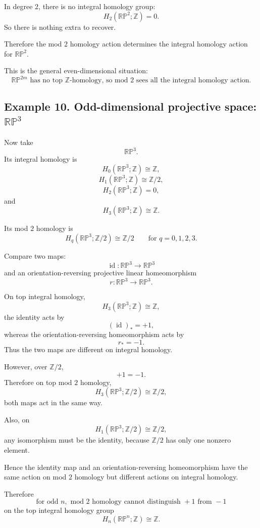 \documentclass[12pt,a4paper]{article}
\theoremstyle{notespace}
\begin{document}
In degree \(2\), there is no integral homology group:
\[
H_2(\mathbb{RP}^2;\mathbb Z)=0.
\]
So there is nothing extra to recover.

Therefore the mod \(2\) homology action determines the integral homology action for \(\mathbb{RP}^2\).

This is the general even-dimensional situation:
\[
\boxed{
	\mathbb{RP}^{2m}
	\text{ has no top } \mathbb Z\text{-homology, so mod }2\text{ sees all the integral homology action.}
}
\]

\subsection{Example 10. Odd-dimensional projective space: \texorpdfstring{\(\mathbb{RP}^3\)}{RP3}}

Now take
\[
\mathbb{RP}^3.
\]
Its integral homology is
\[
H_0(\mathbb{RP}^3;\mathbb Z)\cong\mathbb Z,
\]
\[
H_1(\mathbb{RP}^3;\mathbb Z)\cong\mathbb Z/2,
\]
\[
H_2(\mathbb{RP}^3;\mathbb Z)=0,
\]
and
\[
H_3(\mathbb{RP}^3;\mathbb Z)\cong\mathbb Z.
\]

Its mod \(2\) homology is
\[
H_q(\mathbb{RP}^3;\mathbb Z/2)\cong\mathbb Z/2
\qquad
\text{for }q=0,1,2,3.
\]

Compare two maps:
\[
\operatorname{id}:\mathbb{RP}^3\longrightarrow\mathbb{RP}^3
\]
and an orientation-reversing projective linear homeomorphism
\[
r:\mathbb{RP}^3\longrightarrow\mathbb{RP}^3.
\]

On top integral homology,
\[
H_3(\mathbb{RP}^3;\mathbb Z)\cong\mathbb Z,
\]
the identity acts by
\[
(\operatorname{id})_*=+1,
\]
whereas the orientation-reversing homeomorphism acts by
\[
r_*=-1.
\]
Thus the two maps are different on integral homology.

However, over \(\mathbb Z/2\),
\[
+1=-1.
\]
Therefore on top mod \(2\) homology,
\[
H_3(\mathbb{RP}^3;\mathbb Z/2)\cong\mathbb Z/2,
\]
both maps act in the same way.

Also, on
\[
H_1(\mathbb{RP}^3;\mathbb Z/2)\cong\mathbb Z/2,
\]
any isomorphism must be the identity, because \(\mathbb Z/2\) has only one nonzero element.

Hence the identity map and an orientation-reversing homeomorphism have the same action on mod \(2\) homology but different actions on integral homology.

Therefore
\[
\boxed{
	\text{for odd }n,\text{ mod }2\text{ homology cannot distinguish }+1\text{ from }-1
}
\]
on the top integral homology group
\[
H_n(\mathbb{RP}^n;\mathbb Z)\cong\mathbb Z.
\]
\end{document}
